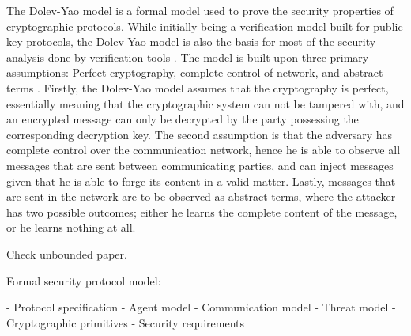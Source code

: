 
The Dolev-Yao model is a formal model used to prove the security properties of cryptographic protocols. While initially being a verification model built for public key protocols, the Dolev-Yao model is also the basis for most of the security analysis done by verification tools \cite{cremers2005operational}. The model is built upon three primary assumptions: Perfect cryptography, complete control of network, and abstract terms \cite{dolev1983security}. Firstly, the Dolev-Yao model assumes that the cryptography is perfect, essentially meaning that the cryptographic system can not be tampered with, and an encrypted message can only be decrypted by the party possessing the corresponding decryption key. The second assumption is that the adversary has complete control over the communication network, hence he is able to observe all messages that are sent between communicating parties, and can inject messages given that he is able to forge its content in a valid matter. Lastly, messages that are sent in the network are to be observed as abstract terms, where the attacker has two possible outcomes; either he learns the complete content of the message, or he learns nothing at all. 

Check unbounded paper.

Formal security protocol model\cite{cremers2005operational}:

- Protocol specification
- Agent model
- Communication model
- Threat model
- Cryptographic primitives
- Security requirements


